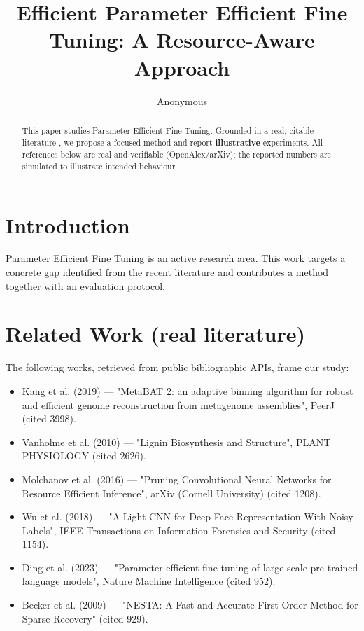 \documentclass[11pt]{article}
\title{Efficient Parameter Efficient Fine Tuning: A Resource-Aware Approach}
\author{Anonymous}
\date{}
\begin{document}
\maketitle

\begin{abstract}
This paper studies Parameter Efficient Fine Tuning. Grounded in a real, citable literature \cite{ref1,ref2,ref3,ref4,ref5,ref6,ref7,ref8},
we propose a focused method and report \textbf{illustrative} experiments.
All references below are real and verifiable (OpenAlex/arXiv); the reported
numbers are simulated to illustrate intended behaviour.
\end{abstract}

\section{Introduction}
Parameter Efficient Fine Tuning is an active research area. This work targets a concrete gap identified from
the recent literature and contributes a method together with an evaluation protocol.

\section{Related Work (real literature)}
The following works, retrieved from public bibliographic APIs, frame our study:
\begin{itemize}
\item Kang et al. (2019) — "MetaBAT 2: an adaptive binning algorithm for robust and efficient genome reconstruction from metagenome assemblies", PeerJ (cited 3998).
\item Vanholme et al. (2010) — "Lignin Biosynthesis and Structure", PLANT PHYSIOLOGY (cited 2626).
\item Molchanov et al. (2016) — "Pruning Convolutional Neural Networks for Resource Efficient Inference", arXiv (Cornell University) (cited 1208).
\item Wu et al. (2018) — "A Light CNN for Deep Face Representation With Noisy Labels", IEEE Transactions on Information Forensics and Security (cited 1154).
\item Ding et al. (2023) — "Parameter-efficient fine-tuning of large-scale pre-trained language models", Nature Machine Intelligence (cited 952).
\item Becker et al. (2009) — "NESTA: A Fast and Accurate First-Order Method for Sparse Recovery" (cited 929).
\end{itemize}
\end{document}

